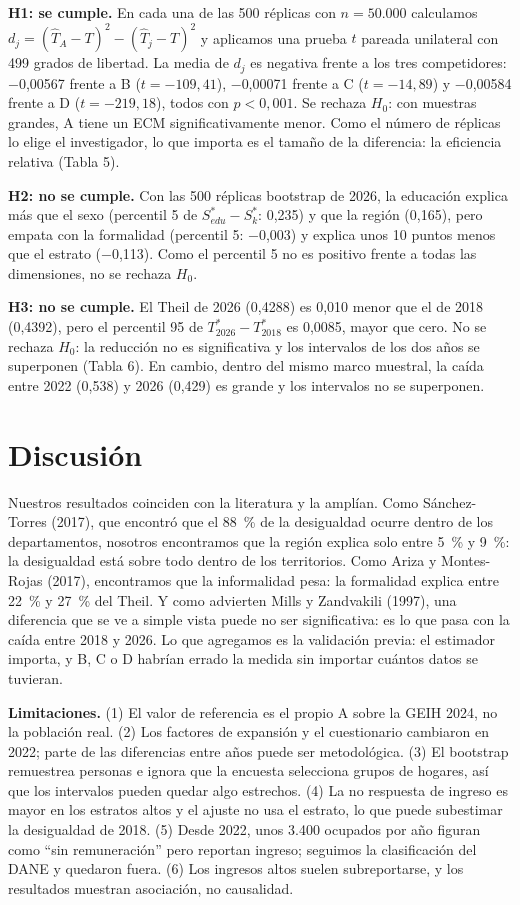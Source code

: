 \documentclass[12pt,letterpaper]{article}
\begin{document}
\textbf{H1: se cumple.} En cada una de las 500 réplicas con $n = 50.000$ calculamos $d_j = (\hat{T}_A - T)^2 - (\hat{T}_j - T)^2$ y aplicamos una prueba $t$ pareada unilateral con 499 grados de libertad. La media de $d_j$ es negativa frente a los tres competidores: $-$0,00567 frente a B ($t = -109,41$), $-$0,00071 frente a C ($t = -14,89$) y $-$0,00584 frente a D ($t = -219,18$), todos con $p < 0,001$. Se rechaza $H_0$: con muestras grandes, A tiene un ECM significativamente menor. Como el número de réplicas lo elige el investigador, lo que importa es el tamaño de la diferencia: la eficiencia relativa (Tabla 5).

\textbf{H2: no se cumple.} Con las 500 réplicas bootstrap de 2026, la educación explica más que el sexo (percentil 5 de $S^*_{edu} - S^*_k$: 0,235) y que la región (0,165), pero empata con la formalidad (percentil 5: $-$0,003) y explica unos 10 puntos menos que el estrato ($-$0,113). Como el percentil 5 no es positivo frente a todas las dimensiones, no se rechaza $H_0$.

\textbf{H3: no se cumple.} El Theil de 2026 (0,4288) es 0,010 menor que el de 2018 (0,4392), pero el percentil 95 de $T^*_{2026} - T^*_{2018}$ es 0,0085, mayor que cero. No se rechaza $H_0$: la reducción no es significativa y los intervalos de los dos años se superponen (Tabla 6). En cambio, dentro del mismo marco muestral, la caída entre 2022 (0,538) y 2026 (0,429) es grande y los intervalos no se superponen.

\section{Discusión}

Nuestros resultados coinciden con la literatura y la amplían. Como Sánchez-Torres (2017), que encontró que el 88~\% de la desigualdad ocurre dentro de los departamentos, nosotros encontramos que la región explica solo entre 5~\% y 9~\%: la desigualdad está sobre todo dentro de los territorios. Como Ariza y Montes-Rojas (2017), encontramos que la informalidad pesa: la formalidad explica entre 22~\% y 27~\% del Theil. Y como advierten Mills y Zandvakili (1997), una diferencia que se ve a simple vista puede no ser significativa: es lo que pasa con la caída entre 2018 y 2026. Lo que agregamos es la validación previa: el estimador importa, y B, C o D habrían errado la medida sin importar cuántos datos se tuvieran.

\textbf{Limitaciones.} (1) El valor de referencia es el propio A sobre la GEIH 2024, no la población real. (2) Los factores de expansión y el cuestionario cambiaron en 2022; parte de las diferencias entre años puede ser metodológica. (3) El bootstrap remuestrea personas e ignora que la encuesta selecciona grupos de hogares, así que los intervalos pueden quedar algo estrechos. (4) La no respuesta de ingreso es mayor en los estratos altos y el ajuste no usa el estrato, lo que puede subestimar la desigualdad de 2018. (5) Desde 2022, unos 3.400 ocupados por año figuran como ``sin remuneración'' pero reportan ingreso; seguimos la clasificación del DANE y quedaron fuera. (6) Los ingresos altos suelen subreportarse, y los resultados muestran asociación, no causalidad.
\end{document}
